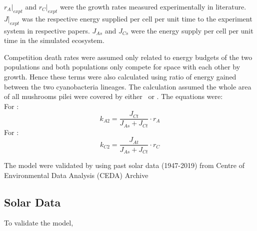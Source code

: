 \documentclass[../thesis.tex]{subfiles} %
\begin{document}
$r_A|_{expt}$ and $r_C|_{expt}$ were the growth rates measured experimentally in literature.  $J|_{expt}$ was the respective energy supplied per cell per unit time to the experiment system in respective papers.  $J_{As}$ and $J_{Cs}$ were the energy supply per cell per unit time in the simulated ecosystem.

Competition death rates were assumed only related to energy budgets of the two populations and both populations only compete for space with each other by growth.  Hence these terms were also calculated using ratio of energy gained between the two cyanobacteria lineages.  The calculation assumed the whole area of all mushrooms pilei were covered by either \As\ or \Cs.  The equations were:\\
For \As:
\begin{equation}
    k_{A2} = \dfrac{J_{Ct}}{J_{As} + J_{Ct}}\cdot r_A
\end{equation}
For \Cs:
\begin{equation}
    k_{C2} = \dfrac{J_{At}}{J_{As} + J_{Ct}}\cdot r_C
\end{equation}

The model were validated by using past solar data (1947-2019) from Centre of Environmental Data Analysis (CEDA) Archive\autocite{solarData}

\subsection{Solar Data}
To validate the model,
\end{document}
